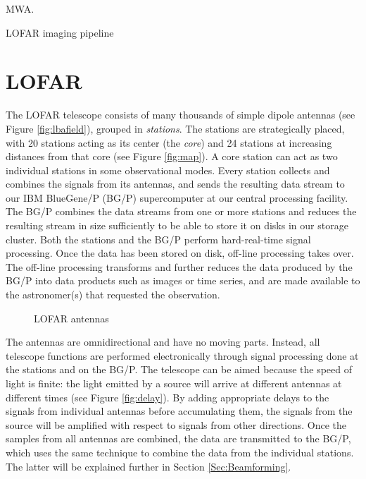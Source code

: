 \documentclass{llncs}
\begin{document}
MWA.

LOFAR imaging pipeline \cite{Romein:10a}

\section{LOFAR}
\label{Sec:LOFAR}

The LOFAR telescope consists of many thousands of simple dipole antennas (see Figure \ref{fig:lbafield}), grouped in \emph{stations}. The stations are strategically placed, with 20 stations acting as its center (the \emph{core}) and 24 stations at increasing distances from that core (see Figure \ref{fig:map}). A core station can act as two individual stations in some observational modes. Every station collects and combines the signals from its antennas, and sends the resulting data stream to our IBM BlueGene/P (BG/P) supercomputer at our central processing facility. The BG/P combines the data streams from one or more stations and reduces the resulting stream in size sufficiently to be able to store it on disks in our storage cluster. Both the stations and the BG/P perform hard-real-time signal processing. Once the data has been stored on disk, off-line processing takes over. The off-line processing transforms and further reduces the data produced by the BG/P into data products such as images or time series, and are made available to the astronomer(s) that requested the observation.

\begin{figure}[ht]
\hfill
{}
\hfill
{}
\caption{LOFAR antennas}
\end{figure}

The antennas are omnidirectional and have no moving parts. Instead, all telescope functions are performed electronically through signal processing done at the stations and on the BG/P. The telescope can be aimed because the speed of light is finite: the light emitted by a source will arrive at different antennas at different times (see Figure \ref{fig:delay}). By adding appropriate delays to the signals from individual antennas before accumulating them, the signals from the source will be amplified with respect to signals from other directions. Once the samples from all antennas are combined, the data are transmitted to the BG/P, which uses the same technique to combine the data from the individual stations. The latter will be explained further in Section \ref{Sec:Beamforming}.
\end{document}
